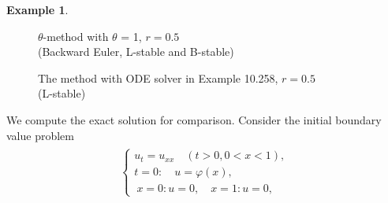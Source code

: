 \documentclass[a4paper,twoside]{ctexart}
\theoremstyle{definition}
\newtheorem{example}[definition]{Example}
\begin{document}
\begin{example}
\begin{figure}[H]
{		}
		\caption*{$\theta$-method with $\theta$ = 1, $r = 0.5$\\ (Backward Euler, L-stable and B-stable)}
	\end{figure}
	\begin{figure}[H]
		\centering  
		\caption*{The method with ODE solver in Example 10.258, $r = 0.5$\\(L-stable)}
	\end{figure}
	We compute the exact solution for comparison. Consider the initial boundary value problem
	\begin{eqnarray}
	\begin{aligned}
	\left\{\begin{matrix}
	u_t= u_{xx}\quad (t>0, 0< x < 1),\\
	t = 0 : \quad u = \varphi (x),\qquad  \qquad \\
	\ x = 0 : u = 0,\quad x = 1 : u = 0,

\end{matrix}
\end{aligned}
\end{eqnarray}
\end{example}
\end{document}
